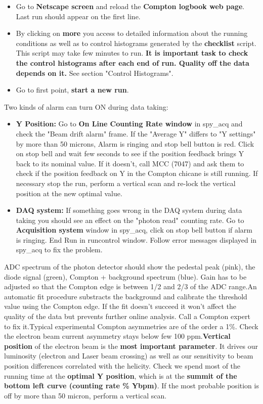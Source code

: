 {{\begin{itemize}
indicating that the run is saved and the online analysis (checklist) is 
running.
\item Go to {\bf Netscape screen} and reload the {\bf Compton logbook web 
page}. Last run should appear on the first line. 
\item By clicking on {\bf more} you access to detailed information about 
the running conditions as well as to control histograms generated by the 
{\bf checklist} script. This script may take few minutes to run.
{\bf It is important task to check the control histograms after each end of 
run. Quality off the data depends on it.} See section "Control Histograms".
\item Go to first point, {\bf start a new run}. 
\end{itemize}

Two kinds of alarm can turn ON during data taking:

\begin{itemize}
\item {\bf Y Position:} Go to {\bf On Line Counting Rate window} in spy\_acq and check 
the "Beam drift alarm" frame. If the "Average Y" differs to "Y settings" by more than 
50 microns, Alarm is ringing and stop bell button is red. Click on stop bell and 
wait few seconds to see if the position feedback brings Y back to its nominal 
value. If it doesn't, call MCC (7047) and ask them to check if the position 
feedback on Y in the Compton chicane is still running.
If necessary stop the run, perform a vertical scan and re-lock the vertical 
position at the new optimal value.
\item {\bf DAQ system:} If something goes wrong in the DAQ system during data 
taking you should see an effect on the "photon read" counting rate. Go to 
{\bf Acquisition system} window in spy\_acq, click on stop bell button if alarm is 
ringing. End Run in runcontrol window. Follow error messages displayed in spy\_acq 
to fix the problem.
\end{itemize}

ADC spectrum of the photon detector should show the 
pedestal peak
(pink), the diode signal (green), Compton + background spectrum (blue). 
Gain has to be adjusted so that the Compton edge is between 1/2 and 2/3 
of the ADC range.An automatic fit procedure substracts the background and calibrate 
the threshold value using the Compton edge. If the fit doesn't succeed 
it won't affect the quality of the data but prevents further online 
analysis. Call a Compton expert to fix it.Typical experimental Compton asymmetries 
are of the order a 1\%. 
Check the electron beam current asymmetry stays below few 100 ppm.{\bf Vertical position} 
of the electron beam is the {\bf most important parameter}. 
It drives our luminosity (electron and Laser 
beam crossing) as well as our sensitivity to beam position differences 
correlated with the helicity.
Check we spend most of the running time at the {\bf optimal Y position}, 
which is at the {\bf summit of the bottom left curve (counting rate \% Ybpm)}.
If the most probable position is off by more than 50 micron, perform a 
vertical scan.


}}
